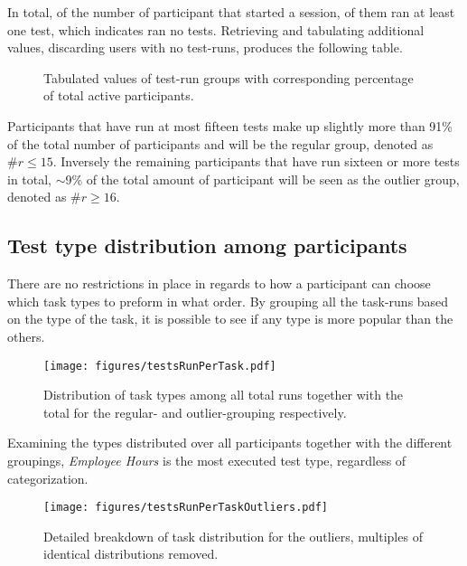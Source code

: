     In total, of the  number of participant that
    started a session,  of them ran at least one
    test, which indicates  ran no tests. Retrieving and
    tabulating additional values, discarding users with no test-runs,
    produces the following table.

    \begin{figure}[h!]
      \centering
      \caption{%
        Tabulated values of test-run groups with corresponding percentage
        of total active participants.%
      }
    \end{figure}

    Participants that have run at most fifteen tests make up slightly more
    than 91\% of the total number of participants and will be the regular
    group, denoted as $\#r\leq15$. Inversely the remaining participants
    that have run sixteen or more tests in total, $\sim$9\% of the total
    amount of participant will be seen as the outlier group, denoted as
    $\#r\geq16$.

  \subsection{Test type distribution among participants}

    There are no restrictions in place in regards to how a participant
    can choose which task types to preform in what order. By grouping all
    the task-runs based on the type of the task, it is possible to see if
    any type is more popular than the others.

    \begin{figure}[h!]
      \centering
      \texttt{[image: figures/testsRunPerTask.pdf]}
      \caption{
        Distribution of task types among all total runs together with the
        total for the regular- and outlier-grouping respectively.
      }
    \end{figure}

    Examining the types distributed over all participants together
    with the different groupings, \textit{Employee Hours} is the most
    executed test type, regardless of categorization.

    \begin{figure}[h!]
      \centering
      \texttt{[image: figures/testsRunPerTaskOutliers.pdf]}
      \caption{
        Detailed breakdown of task distribution for the outliers, multiples
        of identical distributions removed.
      }
      \label{label_testsRunPerTaskOutliers}
    \end{figure}

